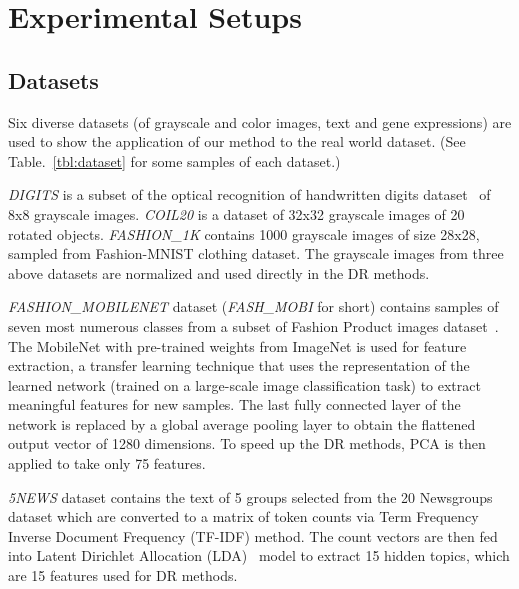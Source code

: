 \section{Experimental Setups}\label{sec:xp:setup}


\subsection{Datasets}\label{sec:xp:data}

Six diverse datasets (of grayscale and color images, text and gene expressions) are used to show the application of our method to the real world dataset. (See Table.~\ref{tbl:dataset} for some samples of each dataset.)

\emph{DIGITS} is a subset of the optical recognition of handwritten digits dataset~\cite{kaynak1995methods} of 8x8 grayscale images.
\emph{COIL20} \cite{nene1996} is a dataset of 32x32 grayscale images of 20 rotated objects.
\emph{FASHION\_1K} contains 1000 grayscale images of size 28x28, sampled from Fashion-MNIST\cite{xiao2017/online} clothing dataset.
The grayscale images from three above datasets are normalized and used directly in the DR methods.

\emph{FASHION\_MOBILENET} dataset (\emph{FASH\_MOBI} for short) contains samples of seven most numerous classes from a subset of Fashion Product images dataset~\cite{fashionproduct}.
The MobileNet\cite{howard2017mobilenets} with pre-trained weights from ImageNet is used for feature extraction, a transfer learning technique that uses the representation of the learned network (trained on a large-scale image classification task) to extract meaningful features for new samples.
The last fully connected layer of the network is replaced by a global average pooling layer\cite[Sec.3.2]{lin2013network} to obtain the flattened output vector of 1280 dimensions.
To speed up the DR methods, PCA is then applied to take only 75 features.

\emph{5NEWS} dataset contains the text of 5 groups selected from the 20 Newsgroups dataset which are converted to a matrix of token counts via Term Frequency Inverse Document Frequency (TF-IDF) method.
The count vectors are then fed into Latent Dirichlet Allocation (LDA)~\cite{blei2003latent} model to extract 15 hidden topics, which are 15 features used for DR methods.


